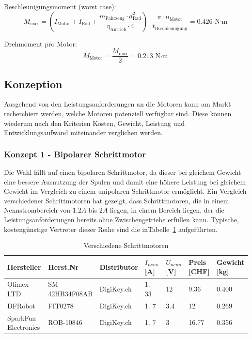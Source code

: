 \documentclass[main.  tex]{subfiles} %
\begin{document}
\vspace{0.2cm}

Beschleunigungsmoment (worst case):
\[
    M_{\text{max}} = \left( I_{\text{Motor}} + I_{\text{Rad}} + \frac{m_{\text{Fahrzeug}} \cdot d_{\text{Rad}}^2}{\eta_{\text{Antrieb}} \cdot 4} \right) \cdot \frac{\pi \cdot n_{\text{Motor}}}{t_{\text{Beschleunigung}}} = 0.426 \, \si{\newton \cdot \meter}
\]

\vspace{0.2cm}

Drehmoment pro Motor:
\[
    M_{\text{Motor}} = \frac{M_{\text{max}}}{2} = 0.213 \, \si{\newton\cdot \meter}
\]

\newpage

\subsection*{Konzeption}

Ausgehend von den Leistungsanforderungen an die Motoren kann am Markt
recherchiert werden, welche Motoren potenziell verfügbar sind. Diese können
wiederum nach den Kriterien Kosten, Gewicht, Leistung und Entwicklungsaufwand
miteinander verglichen werden.

\subsubsection*{Konzept 1 - Bipolarer Schrittmotor} %

Die Wahl fällt auf einen bipolaren Schrittmotor, da dieser bei gleichem Gewicht
eine bessere Ausnutzung der Spulen und damit eine höhere Leistung bei gleichem
Gewicht im Vergleich zu einem unipolaren Schrittmotor ermöglicht. Ein Vergleich
verschiedener Schrittmotoren hat gezeigt, dass Schrittmotoren, die in einem
Nennstrombereich von $1. 2A$ bis $2A$ liegen, in einem Bereich liegen, der die
Leistungsanforderungen bereits ohne Zwischengetriebe erfüllen kann. Typische,
kostengünstige Vertreter dieser Reihe sind die
inTabelle~\ref{tab:Schrittmotoren_different} aufgeführten.

\begin{table}[h]
    \centering
    \begin{tabular}{|p{2cm}|p{3cm}|p{2cm}|p{1cm}|p{1cm}|p{1cm}|p{1.5cm}|}
        \hline
        Hersteller           & Herst.Nr       & Distributor & $I_{nenn} $ [A] & $U_{nenn}$ [V] & Preis [CHF] & Gewicht [kg] \\ \hline
        Olimex LTD           & SM-42HB34F08AB & DigiKey.ch  & 1.  33          & 12             & 9.36        & 0.400        \\ \hline
        DFRobot              & FIT0278        & DigiKey.ch  & 1.  7           & 3.4            & 12          & 0.269        \\ \hline
        SparkFun Electronics & ROB-10846      & DigiKey.ch  & 1.  7           & 3              & 16.77       & 0.356        \\ \hline
    \end{tabular}
    \caption{Verschiedene Schrittmotoren}
    \label{tab:Schrittmotoren_different}
\end{table}
\end{document}
